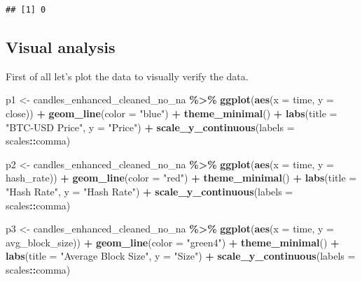 \documentclass[
]{article}
\newenvironment{Shaded}{\begin{snugshade}}{\end{snugshade}}
\newcommand{\AttributeTok}[1]{\textcolor[rgb]{0.13,0.29,0.53}{#1}}
\newcommand{\FunctionTok}[1]{\textcolor[rgb]{0.13,0.29,0.53}{\textbf{#1}}}
\newcommand{\NormalTok}[1]{#1}
\newcommand{\OtherTok}[1]{\textcolor[rgb]{0.56,0.35,0.01}{#1}}
\newcommand{\SpecialCharTok}[1]{\textcolor[rgb]{0.81,0.36,0.00}{\textbf{#1}}}
\newcommand{\StringTok}[1]{\textcolor[rgb]{0.31,0.60,0.02}{#1}}
\begin{document}
\begin{verbatim}
## [1] 0
\end{verbatim}

\hypertarget{visual-analysis}{%
\subsection{Visual analysis}\label{visual-analysis}}

First of all let's plot the data to visually verify the data.

\begin{Shaded}
\begin{Highlighting}[]
\NormalTok{p1 }\OtherTok{\textless{}{-}}\NormalTok{ candles\_enhanced\_cleaned\_no\_na }\SpecialCharTok{\%\textgreater{}\%}
    \FunctionTok{ggplot}\NormalTok{(}\FunctionTok{aes}\NormalTok{(}\AttributeTok{x =}\NormalTok{ time, }\AttributeTok{y =}\NormalTok{ close)) }\SpecialCharTok{+} \FunctionTok{geom\_line}\NormalTok{(}\AttributeTok{color =} \StringTok{"blue"}\NormalTok{) }\SpecialCharTok{+}
    \FunctionTok{theme\_minimal}\NormalTok{() }\SpecialCharTok{+} \FunctionTok{labs}\NormalTok{(}\AttributeTok{title =} \StringTok{"BTC{-}USD Price"}\NormalTok{, }\AttributeTok{y =} \StringTok{"Price"}\NormalTok{) }\SpecialCharTok{+}
    \FunctionTok{scale\_y\_continuous}\NormalTok{(}\AttributeTok{labels =}\NormalTok{ scales}\SpecialCharTok{::}\NormalTok{comma)}

\NormalTok{p2 }\OtherTok{\textless{}{-}}\NormalTok{ candles\_enhanced\_cleaned\_no\_na }\SpecialCharTok{\%\textgreater{}\%}
    \FunctionTok{ggplot}\NormalTok{(}\FunctionTok{aes}\NormalTok{(}\AttributeTok{x =}\NormalTok{ time, }\AttributeTok{y =}\NormalTok{ hash\_rate)) }\SpecialCharTok{+} \FunctionTok{geom\_line}\NormalTok{(}\AttributeTok{color =} \StringTok{"red"}\NormalTok{) }\SpecialCharTok{+}
    \FunctionTok{theme\_minimal}\NormalTok{() }\SpecialCharTok{+} \FunctionTok{labs}\NormalTok{(}\AttributeTok{title =} \StringTok{"Hash Rate"}\NormalTok{, }\AttributeTok{y =} \StringTok{"Hash Rate"}\NormalTok{) }\SpecialCharTok{+}
    \FunctionTok{scale\_y\_continuous}\NormalTok{(}\AttributeTok{labels =}\NormalTok{ scales}\SpecialCharTok{::}\NormalTok{comma)}

\NormalTok{p3 }\OtherTok{\textless{}{-}}\NormalTok{ candles\_enhanced\_cleaned\_no\_na }\SpecialCharTok{\%\textgreater{}\%}
    \FunctionTok{ggplot}\NormalTok{(}\FunctionTok{aes}\NormalTok{(}\AttributeTok{x =}\NormalTok{ time, }\AttributeTok{y =}\NormalTok{ avg\_block\_size)) }\SpecialCharTok{+} \FunctionTok{geom\_line}\NormalTok{(}\AttributeTok{color =} \StringTok{"green4"}\NormalTok{) }\SpecialCharTok{+}
    \FunctionTok{theme\_minimal}\NormalTok{() }\SpecialCharTok{+} \FunctionTok{labs}\NormalTok{(}\AttributeTok{title =} \StringTok{"Average Block Size"}\NormalTok{, }\AttributeTok{y =} \StringTok{"Size"}\NormalTok{) }\SpecialCharTok{+}
    \FunctionTok{scale\_y\_continuous}\NormalTok{(}\AttributeTok{labels =}\NormalTok{ scales}\SpecialCharTok{::}\NormalTok{comma)}


\end{Highlighting}
\end{Shaded}
\end{document}
